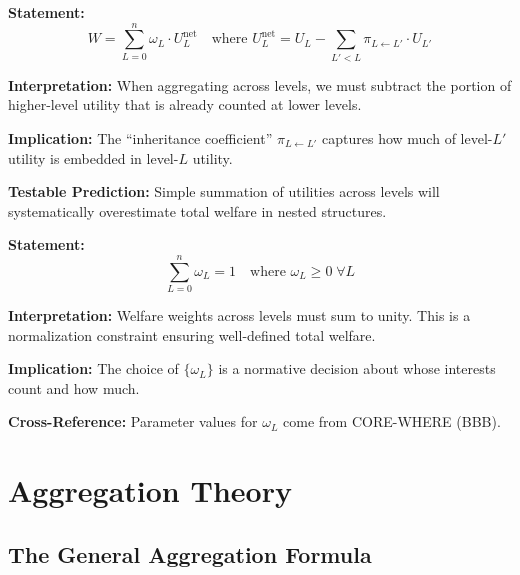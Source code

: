 \begin{tcolorbox}[colback=gray!5!white, colframe=gray!75!black,
    title=Axiom UNMAPPED_SRL-7: No Double-Counting]
\textbf{Statement:}
\begin{equation}
W = \sum_{L=0}^{n} \omega_L \cdot U_L^{\text{net}} \quad \text{where } U_L^{\text{net}} = U_L - \sum_{L' < L} \pi_{L \leftarrow L'} \cdot U_{L'}
\end{equation}

\textbf{Interpretation:} When aggregating across levels, we must subtract the portion of
higher-level utility that is already counted at lower levels.

\textbf{Implication:} The ``inheritance coefficient'' $\pi_{L \leftarrow L'}$ captures how much
of level-$L'$ utility is embedded in level-$L$ utility.

\textbf{Testable Prediction:} Simple summation of utilities across levels will systematically
overestimate total welfare in nested structures.
\end{tcolorbox}

\begin{tcolorbox}[colback=gray!5!white, colframe=gray!75!black,
    title=Axiom UNMAPPED_SRL-8: Weight Normalization]
\textbf{Statement:}
\begin{equation}
\sum_{L=0}^{n} \omega_L = 1 \quad \text{where } \omega_L \geq 0 \; \forall L
\end{equation}

\textbf{Interpretation:} Welfare weights across levels must sum to unity.
This is a normalization constraint ensuring well-defined total welfare.

\textbf{Implication:} The choice of $\{\omega_L\}$ is a normative decision about whose
interests count and how much.

\textbf{Cross-Reference:} Parameter values for $\omega_L$ come from CORE-WHERE (BBB).
\end{tcolorbox}


\section{Aggregation Theory}
\label{sec:who-aggregation}

\subsection{The General Aggregation Formula}

